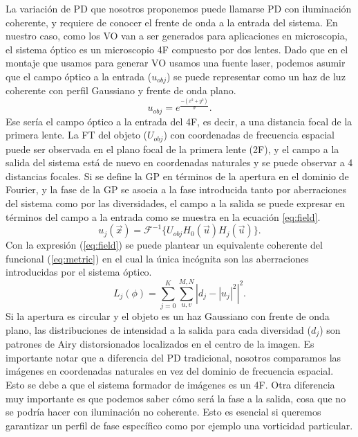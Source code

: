 La variación de PD que nosotros proponemos puede llamarse PD con
iluminación coherente, y requiere de 
conocer el frente de onda a la entrada del sistema. En nuestro caso,
como los VO van a ser generados para aplicaciones en microscopia,
el sistema óptico es un microscopio 4F compuesto por dos lentes. 
 Dado que en el montaje que usamos para generar VO usamos una fuente laser, podemos asumir que el campo óptico a la entrada ($u_{obj}$) se puede representar
como un haz de luz coherente con perfil Gaussiano y frente de onda
plano. 
$$u_{obj} = e^{\frac{-(x^2+y^2)}{\sigma}}.$$
 Ese sería el campo óptico a la entrada del 4F, es decir, a una distancia focal de la primera lente. La FT del
 objeto ($U_{obj}$) con coordenadas de frecuencia espacial puede ser
 observada en el plano focal de la
 primera lente (2F), y el campo a la salida del sistema está de nuevo
 en coordenadas naturales y se puede observar a 4 distancias
 focales. Si se define la GP en términos de la apertura en el dominio de Fourier, y
 la fase de la GP se asocia a la fase introducida
 tanto por aberraciones del sistema como por las diversidades, el
 campo a la salida se puede expresar en términos del campo a la
 entrada como se muestra en la ecuación \ref{eq:field}.
\begin{equation}\label{eq:field}
u_{j}(\vec{x}) = \mathcal{F}^{- 1}\{ U_{obj} H_0(\vec{u}) H_j(\vec{u}) \}.
\end{equation} 
Con la expresión (\ref{eq:field}) se puede plantear un equivalente coherente del
funcional (\ref{eq:metric}) en el cual la única incógnita son las
aberraciones introducidas por el sistema óptico.
\begin{equation}
L_j(\phi)= \sum_{j=0}^{K} \sum_{u,v}^{M,N}  \left |d_{j} - |u_j|^2
\right | ^2.
\label{eq:metric_coherent}
\end{equation}
Si la apertura es circular y el objeto es un haz Gaussiano con frente
de onda plano, las distribuciones de intensidad a la salida para cada diversidad ($d_{j}$)
son patrones de Airy distorsionados 
localizados en el centro de la imagen.  
Es importante notar que a diferencia del PD tradicional, nosotros
comparamos las imágenes en coordenadas naturales en vez del dominio de
frecuencia espacial. Esto se debe a que el sistema formador de
imágenes es un 4F. Otra diferencia muy importante es que podemos saber
cómo será la fase a la salida, cosa que no se podría hacer con
iluminación no coherente. Esto es esencial si queremos garantizar un
perfil de fase específico como por ejemplo una vorticidad particular. 

